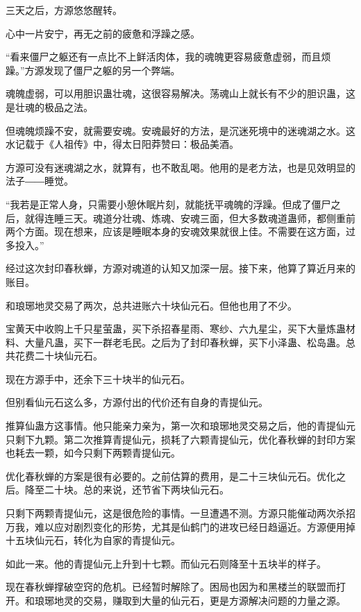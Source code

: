 
\begin{this_body}

三天之后，方源悠悠醒转。

心中一片安宁，再无之前的疲惫和浮躁之感。

“看来僵尸之躯还有一点比不上鲜活肉体，我的魂魄更容易疲惫虚弱，而且烦躁。”方源发现了僵尸之躯的另一个弊端。

魂魄虚弱，可以用胆识蛊壮魂，这很容易解决。荡魂山上就长有不少的胆识蛊，这是壮魂的极品之法。

但魂魄烦躁不安，就需要安魂。安魂最好的方法，是沉迷死境中的迷魂湖之水。这水记载于《人祖传》中，得太日阳莽赞曰：极品美酒。

方源可没有迷魂湖之水，就算有，也不敢乱喝。他用的是老方法，也是见效明显的法子――睡觉。

“我若是正常人身，只需要小憩休眠片刻，就能抚平魂魄的浮躁。但成了僵尸之后，就得连睡三天。魂道分壮魂、炼魂、安魂三面，但大多数魂道蛊师，都侧重前两个方面。现在想来，应该是睡眠本身的安魂效果就很上佳。不需要在这方面，过多投入。”

经过这次封印春秋蝉，方源对魂道的认知又加深一层。接下来，他算了算近月来的账目。

和琅琊地灵交易了两次，总共进账六十块仙元石。但他也用了不少。

宝黄天中收购上千只星萤蛊，买下杀招春星雨、寒纱、六九星尘，买下大量炼蛊材料、大量凡蛊，买下一群老毛民。之后为了封印春秋蝉，买下小泽蛊、松岛蛊。总共花费二十块仙元石。

现在方源手中，还余下三十块半的仙元石。

但别看仙元石这么多，方源付出的代价还有自身的青提仙元。

推算仙蛊方这事情。他只能亲力亲为，第一次和琅琊地灵交易之后，他的青提仙元只剩下九颗。第二次推算青提仙元，损耗了六颗青提仙元，优化春秋蝉的封印方案也耗去一颗，如今只剩下两颗青提仙元。

优化春秋蝉的方案是很有必要的。之前估算的费用，是二十三块仙元石。优化之后。降至二十块。总的来说，还节省下两块仙元石。

只剩下两颗青提仙元，这是很危险的事情。一旦遭遇不测。方源只能催动两次杀招万我，难以应对剧烈变化的形势，尤其是仙鹤门的进攻已经日趋逼近。方源便用掉十五块仙元石，转化为自家的青提仙元。

如此一来。他的青提仙元上升到十七颗。而仙元石则降至十五块半的样子。

现在春秋蝉撑破空窍的危机。已经暂时解除了。困局也因为和黑楼兰的联盟而打开。和琅琊地灵的交易，赚取到大量的仙元石，更是方源解决问题的力量之源。


\end{this_body}
